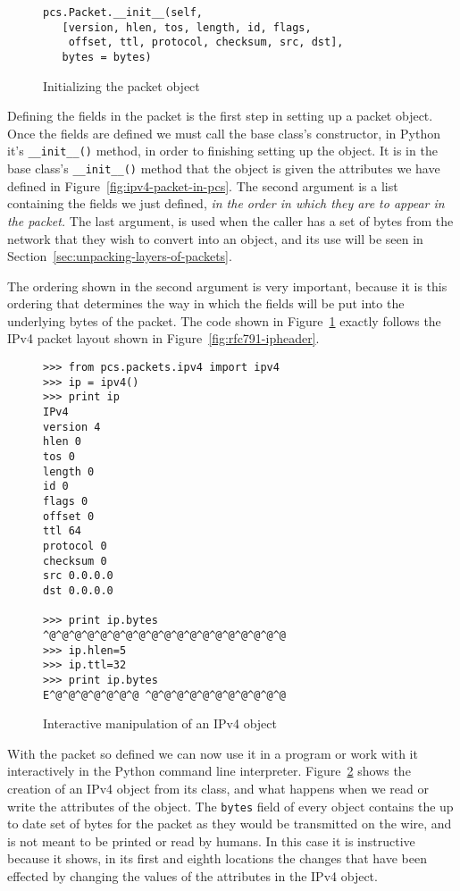 \documentclass{sig-alternate-10pt}
\begin{document}
\begin{figure}
  \centering
\begin{verbatim}
pcs.Packet.__init__(self,
   [version, hlen, tos, length, id, flags, 
    offset, ttl, protocol, checksum, src, dst],
   bytes = bytes)
\end{verbatim}
  \caption{Initializing the packet object}
  \label{fig:initializing-the-packet-object}
\end{figure}

Defining the fields in the packet is the first step in setting up a
packet object.  Once the fields are defined we must call the base
class's constructor, in Python it's \verb|__init__()| method, in order
to finishing setting up the object.  It is in the base class's
\verb|__init__()| method that the object is given the attributes we
have defined in Figure~\ref{fig:ipv4-packet-in-pcs}.  The second
argument is a list containing the fields we just defined, \emph{in the order
in which they are to appear in the packet.}  The last argument,
 is used when the caller has a set of bytes from the
network that they wish to convert into an object, and its use will be
seen in Section~\ref{sec:unpacking-layers-of-packets}.

The ordering shown in the second argument is very important, because
it is this ordering that determines the way in which the fields will
be put into the underlying bytes of the packet.  The code shown in
Figure~\ref{fig:initializing-the-packet-object} exactly follows the
IPv4 packet layout shown in Figure~\ref{fig:rfc791-ipheader}.

\begin{figure}
  \centering
\begin{verbatim}
>>> from pcs.packets.ipv4 import ipv4
>>> ip = ipv4()
>>> print ip
IPv4
version 4
hlen 0
tos 0
length 0
id 0
flags 0
offset 0
ttl 64
protocol 0
checksum 0
src 0.0.0.0
dst 0.0.0.0

>>> print ip.bytes
^@^@^@^@^@^@^@^@^@^@^@^@^@^@^@^@^@^@^@
>>> ip.hlen=5
>>> ip.ttl=32
>>> print ip.bytes
E^@^@^@^@^@^@^@ ^@^@^@^@^@^@^@^@^@^@^@
\end{verbatim}
  \caption{Interactive manipulation of an IPv4 object}
  \label{fig:interactive-manipulation-of-an-ipv4-object}
\end{figure}

With the packet so defined we can now use it in a program or work with
it interactively in the Python command line interpreter.
Figure~\ref{fig:interactive-manipulation-of-an-ipv4-object} shows the
creation of an IPv4 object from its class, and what happens when we
read or write the attributes of the object.  The \verb|bytes| field of
every  object contains the up to date set of bytes for
the packet as they would be transmitted on the wire, and is not meant
to be printed or read by humans.  In this case it is instructive
because it shows, in its first and eighth locations the changes that
have been effected by changing the values of the attributes in the
IPv4 object.
\end{document}
